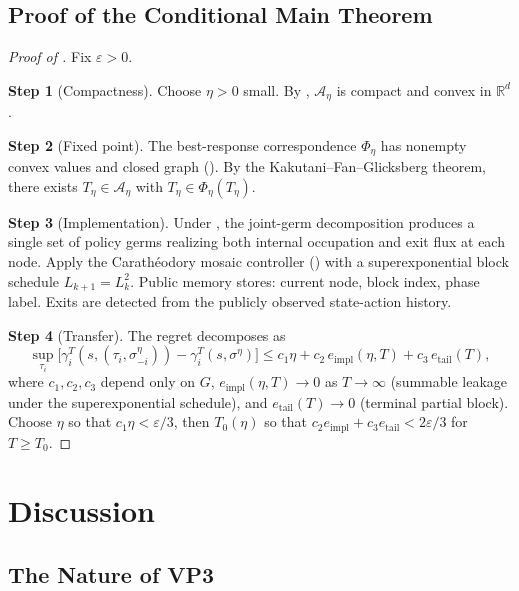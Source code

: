 \documentclass[12pt,a4paper]{article}
\theoremstyle{definition}
\newcommand{\eps}{\varepsilon}
\newcommand{\R}{\mathbb{R}}
\begin{document}
\subsection{Proof of the Conditional Main Theorem}

\begin{proof}[Proof of ]
Fix $\eps > 0$.

\textbf{Step 1} (Compactness).  Choose $\eta > 0$ small.  By , $\mathcal{A}_\eta$ is compact and convex in $\R^d$.

\textbf{Step 2} (Fixed point).  The best-response correspondence $\Phi_\eta$ has nonempty convex values and closed graph ().  By the Kakutani--Fan--Glicksberg theorem, there exists $T_\eta \in \mathcal{A}_\eta$ with $T_\eta \in \Phi_\eta(T_\eta)$.

\textbf{Step 3} (Implementation).  Under , the joint-germ decomposition produces a single set of policy germs realizing both internal occupation and exit flux at each node.  Apply the Carath\'eodory mosaic controller () with a superexponential block schedule $L_{k+1} = L_k^2$.  Public memory stores: current node, block index, phase label.  Exits are detected from the publicly observed state-action history.

\textbf{Step 4} (Transfer).  The regret decomposes as
\[
\sup_{\tau_i} \bigl[\gamma_i^T(s, (\tau_i, \sigma_{-i}^\eta)) - \gamma_i^T(s, \sigma^\eta)\bigr] \leq c_1 \eta + c_2 \, e_{\mathrm{impl}}(\eta, T) + c_3 \, e_{\mathrm{tail}}(T),
\]
where $c_1, c_2, c_3$ depend only on $G$, $e_{\mathrm{impl}}(\eta, T) \to 0$ as $T \to \infty$ (summable leakage under the superexponential schedule), and $e_{\mathrm{tail}}(T) \to 0$ (terminal partial block).  Choose $\eta$ so that $c_1 \eta < \eps/3$, then $T_0(\eta)$ so that $c_2 e_{\mathrm{impl}} + c_3 e_{\mathrm{tail}} < 2\eps/3$ for $T \geq T_0$.
\end{proof}

\section{Discussion}
\label{sec:vp3-discussion}

\subsection{The Nature of VP3}
\end{document}
